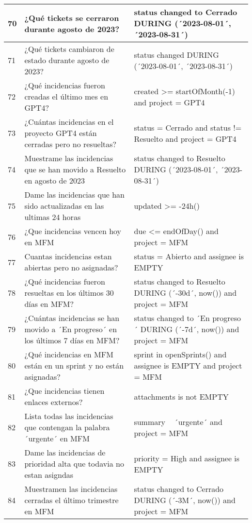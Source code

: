 \begin{center}
\begin{longtable}{ | p{1cm} | p{8cm} | p{6cm} | }
        \hline
        70 & ¿Qué tickets se cerraron durante agosto de 2023? & status changed to Cerrado DURING (´2023-08-01´, ´2023-08-31´) \\
        \hline
        71 & ¿Qué tickets cambiaron de estado durante agosto de 2023? & status changed DURING (´2023-08-01´, ´2023-08-31´) \\
        \hline
        72 & ¿Qué incidencias fueron creadas el último mes en GPT4? & created >= startOfMonth(-1) and project = GPT4 \\
        \hline
        73 & ¿Cuántas incidencias en el proyecto GPT4 están cerradas pero no resueltas? & status = Cerrado and status != Resuelto and project = GPT4 \\
        \hline
        74 & Muestrame las incidencias que se han movido a Resuelto en agosto de 2023 & status changed to Resuelto DURING (´2023-08-01´, ´2023-08-31´) \\
        \hline
        75 & Dame las incidencias que han sido actualizadas en las ultimas 24 horas & updated >= -24h() \\
        \hline
        76 & ¿Que incidencias vencen hoy en MFM & due <= endOfDay() and project = MFM \\
        \hline
        77 & Cuantas incidencias estan abiertas pero no asignadas? & status = Abierto and assignee is EMPTY \\
        \hline
        78 & ¿Qué incidencias fueron resueltas en los últimos 30 días en MFM? & status changed to Resuelto DURING (´-30d´, now()) and project = MFM \\
        \hline
        79 & ¿Cuántas incidencias se han movido a ´En progreso´ en los últimos 7 días en MFM? & status changed to ´En progreso´ DURING (´-7d´, now()) and project = MFM \\
        \hline
        80 & ¿Qué incidencias en MFM están en un sprint y no están asignadas? & sprint in openSprints() and assignee is EMPTY and project = MFM \\
        \hline
        81 & ¿Que incidencias tienen enlaces externos? & attachments is not EMPTY \\
        \hline
        82 & Lista todas las incidencias que contengan la palabra ´urgente´ en MFM & summary ~ ´urgente´ and project = MFM \\
        \hline
        83 & Dame las incidencias de prioridad alta que todavia no estan asigndas & priority = High and assignee is EMPTY \\
        \hline
        84 & Muestramen las incidencias cerradas el último trimestre en MFM & status changed to Cerrado DURING (´-3M´, now()) and project = MFM \\

\end{longtable}
\end{center}
